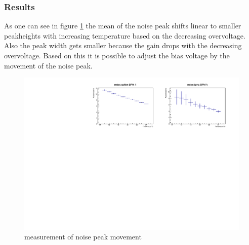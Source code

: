 \subsubsection{Results}
As one can see in figure \ref{NoiseMove} the mean of the noise peak shifts linear to smaller peakheights with increasing temperature based on the decreasing overvoltage. Also the peak width gets smaller because the gain drops with the decreasing overvoltage. Based on this it is possible to adjust the bias voltage by the movement of the noise peak.
\begin{figure}[h]
	\centering
	\includegraphics[width = .99\textwidth]{Figures/radermacher/result_ExpGauOnlySipmATriggerNEW.pdf}
	\caption{measurement of noise peak movement}
	\label{NoiseMove}
\end{figure}
